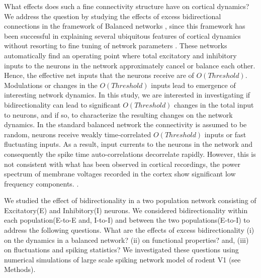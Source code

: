 What effects does such a fine connectivity structure have on cortical dynamics? We address the question by studying the effects of excess bidirectional connections in the framework of Balanced networks \cite{carl1996, carl1998, carl2004}, since this framework has been successful in explaining several ubiquitous features of cortical dynamics without resorting to fine tuning of network parameters \cite{softky1993, Holt1996, roxin2011}. These networks automatically find an operating point where total excitatory and inhibitory inputs to the neurons in the network approximately cancel or balance each other.  Hence, the effective net inputs that the neurons receive are of $O(Threshold)$. Modulations or changes in the $O(Threshold)$ inputs lead to emergence of interesting network dynamics. In this study, we are interested in investigating if bidirectionality can lead to significant $O(Threshold)$ changes in the total input to neurons, and if so, to characterize the resulting changes on the network dynamics. In the standard balanced network the connectivity is assumed to be random, neurons receive weakly time-correlated $O(Threshold)$ inputs or fast fluctuating inputs. As a result, input currents to the neurons in the network and consequently the spike time auto-correlations decorrelate rapidly\cite{carl1996, carl1998}. However, this is not consistent with what has been observed in cortical recordings, the power spectrum of membrane voltages recorded in the cortex show significant low frequency components. \cite{Tan2014}.	
	
We studied the effect of bidirectionality in a two population network consisting of Excitatory(E) and Inhibitory(I) neurons. We considered bidirectionality within each population(E-to-E and, I-to-I) and between the two populations(E-to-I) to address the following questions. What are the effects of excess bidirectionality (i) on the dynamics in a balanced network? (ii) on functional properties? and, (iii) on fluctuations and spiking statistics? We investigated these questions using numerical simulations of large scale spiking network  model of rodent V1 (see Methods). \\
 
